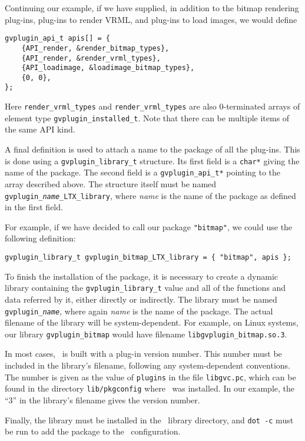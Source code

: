 Continuing our example, if we have supplied, in addition
to the bitmap rendering plug-ins, plug-ins to render VRML, and
plug-ins to load images, we would define
\begin{verbatim}
gvplugin_api_t apis[] = {
    {API_render, &render_bitmap_types},
    {API_render, &render_vrml_types},
    {API_loadimage, &loadimage_bitmap_types},
    {0, 0},
};
\end{verbatim}
Here {\tt render\_vrml\_types} and  {\tt render\_vrml\_types}
are also 0-terminated arrays of element type {\tt gvplugin\_installed\_t}.
Note that there can be multiple items of the same API kind.

A final definition is used to attach a name to the package of
all the plug-ins. This is done using a {\tt gvplugin\_library\_t}
structure. Its first field is a {\tt char*} giving the name of the
package. The second field is a {\tt gvplugin\_api\_t*} pointing to
the array described above. The structure itself must be named
{\tt gvplugin\_{\em name}\_LTX\_library}, where {\em name} is the
name of the package as defined in the first field. 

For example, if we have decided to call our package {\tt "bitmap"},
we could use the following definition:
\begin{verbatim}
gvplugin_library_t gvplugin_bitmap_LTX_library = { "bitmap", apis };
\end{verbatim}

To finish the installation of the package, it is necessary to create
a dynamic library containing the {\tt gvplugin\_library\_t} value and
all of the functions and data referred by it, either directly or
indirectly. The library must be named {\tt gvplugin\_{\em name}},
where again {\em name} is the name of the package. The actual filename
of the library will be system-dependent. For example, on Linux systems,
our library {\tt gvplugin\_bitmap} would have filename 
{\tt libgvplugin\_bitmap.so.3}. 

In most cases, \gviz\ is built with
a plug-in version number. This number must be included in the library's
filename, following any system-dependent conventions. 
The number is given as the value of {\tt plugins} in the file
{\tt libgvc.pc}, which can be found in the directory {\tt lib/pkgconfig}
where \gviz\ was installed.
In our example, the ``3'' in the library's filename gives the version number. 

Finally, the library must be installed in the \gviz\ library directory,
and {\tt dot -c} must be run to add the package to the \gviz\ configuration.

